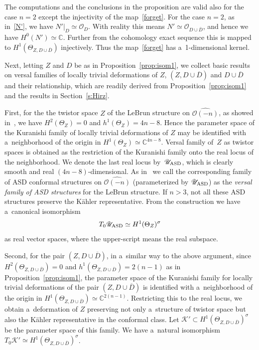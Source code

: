 \documentclass[pdftex]{sigma}
\numberwithin{equation}{section}
\begin{document}
\begin{Remark}
The computations and the conclusions in the proposition are valid also for the case $n=2$ except the injectivity of the
map~\eqref{forget}.
For the case $n=2$, as in~\eqref{N'}, we have $N'|_D\simeq \mathscr O_D$.
With reality this means $N'\simeq \mathscr O_{D\cup\overline D}$, and hence we have $H^0(N')\simeq\mathbb{C}$.
Further from the cohomology exact sequence this is mapped to $H^1(\Theta_{Z,D\cup \overline D})$ injectively.
Thus the map~\eqref{forget} has a~1-dimensional kernel.
\end{Remark}

Next, letting $Z$ and $D$ be as in Proposition~\ref{prop:isom1}, we collect basic results on versal families of locally
trivial deformations of $Z$, $(Z,D\cup\overline D)$ and $D\cup \overline D$ and their relationship, which are readily
derived from Proposition~\ref{prop:isom1} and the results in Section~\ref{s:Hirz}.

First, for the the twistor space $Z$ of the LeBrun structure on $\widehat{\mathscr O(-n)}$, as showed
in~\cite[Proposition~2.1]{HonCMP2}, we have $H^2(\Theta_Z)=0$ and $h^1(\Theta_Z)=4n-8$.
Hence the parameter space of the Kuranishi family of locally trivial deformations of $Z$ may be identif\/ied with
a~neighborhood of the origin in $H^1(\Theta_Z)\simeq\mathbb{C}^{4n-8}$.
Versal family of~$Z$ as twistor spaces is obtained as the restriction of the Kuranishi family onto the real locus of the
neighborhood.
We denote the last real locus by~$\mathscr U_{\rm{ASD}}$, which is clearly smooth and real $(4n-8)$-dimensional.
As in~\cite{HonCMP2} we call the corresponding family of ASD conformal structures on $\widehat{\mathscr O(-n)}$
(parameterized by $\mathscr U_{\rm{ASD}}$) as the {\em versal family of ASD structures} for the LeBrun structure.
If $n>3$, not all these ASD structures preserve the K\"ahler representative.
From the construction we have a~canonical isomorphism
\begin{gather*}%
T_0\mathscr U_{\rm{ASD}}\simeq H^1(\Theta_Z)^{\sigma}
\end{gather*}
as real vector spaces, where the upper-script means the real subspace.

Second, for the pair $(Z,D\cup\overline D)$, in a~similar way to the above argument, since $ H^2 (\Theta_{Z,  D \cup
\overline D} ) =0$ and $ h^1 (\Theta_{Z,  D \cup \overline D} ) =2(n-1)$ as in Proposition~\ref{prop:isom1}, the
parameter space of the Kuranishi family for locally trivial deformations of the pair $(Z,D\cup\overline D)$ is
identif\/ied with a~neighborhood of the origin in $H^1 (\Theta_{Z, D \cup \overline D} ) \simeq\mathbb{C}^{2(n-1)}$.
Restricting this to the real locus, we obtain a~deformation of $Z$ preserving not only a~structure of twistor space but
also the K\"ahler representative in the conformal class.
Let $\mathscr K'\subset H^1(\Theta_{Z,D\cup\overline D})^{\sigma}$ be the parameter space of this family.
We have a~natural isomorphism $ T_0\mathscr K'\simeq H^1(\Theta_{Z,D\cup\overline D})^{\sigma} $.
\end{document}
